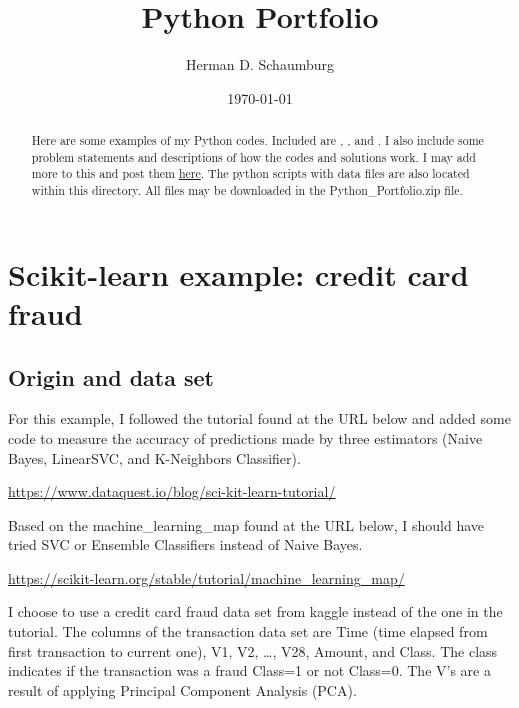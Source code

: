 \documentclass{article}
\title{Python Portfolio}
\author{Herman D. Schaumburg}
\date{\today}
\begin{document}
\setlength{\parindent}{0pt}


\maketitle

\begin{abstract}
Here are some examples of my Python codes.  Included are   , , and .  I also include some problem statements and descriptions of how the codes and solutions work.  I may add more to this and post them \href{https://drive.google.com/drive/folders/1TfQg_Ua7G6nESDf_iinJsPVJzF_vYCEA?usp=sharing}{here}.  The python scripts with data files are also located within this directory.  All files may be downloaded in the Python{\_}Portfolio.zip file.
\end{abstract}

\section{Scikit-learn example: credit card fraud}
\label{sec:scikit}

\subsection{Origin and data set}
For this example, I followed the tutorial found at the URL below and added some code to measure the accuracy of predictions made by three estimators (Naive Bayes, LinearSVC, and K-Neighbors Classifier).  

\href{https://www.dataquest.io/blog/sci-kit-learn-tutorial/}{https://www.dataquest.io/blog/sci-kit-learn-tutorial/}

\bigskip
Based on the machine{\_}learning{\_}map found at the URL below, I should have tried SVC or Ensemble Classifiers instead of Naive Bayes.

\href{https://scikit-learn.org/stable/tutorial/machine_learning_map/}{https://scikit-learn.org/stable/tutorial/machine{\_}learning{\_}map/}

\bigskip
I choose to use a credit card fraud data set from kaggle instead of the one in the tutorial.  The columns of the transaction data set are Time (time elapsed from first transaction to current one), V1, V2, \dots, V28, Amount, and Class.  The class indicates if the transaction was a fraud Class=1 or not Class=0.  The V's are a result of applying Principal Component Analysis (PCA).   
\end{document}
